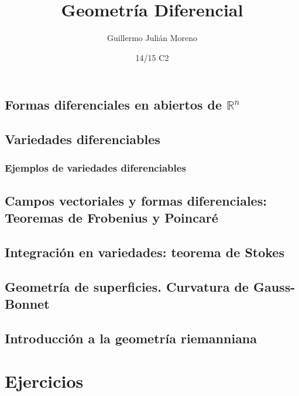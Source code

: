 \documentclass[nochap]{apuntes}
\title{Geometría Diferencial}
\author{Guillermo Julián Moreno}
\date{14/15 C2}
\begin{document}
\pagestyle{plain}
\maketitle

\tableofcontents
\newpage

\section{Formas diferenciales en abiertos de $ℝ^n$}

\section{Variedades diferenciables}

\subsection{Ejemplos de variedades diferenciables}

\section{Campos vectoriales y formas diferenciales: Teoremas de Frobenius y Poincaré}

\section{Integración en variedades: teorema de Stokes}

\section{Geometría de superficies. Curvatura de Gauss-Bonnet}

\section{Introducción a la geometría riemanniana}

\appendix

\chapter{Ejercicios}

\printindex
\end{document}
